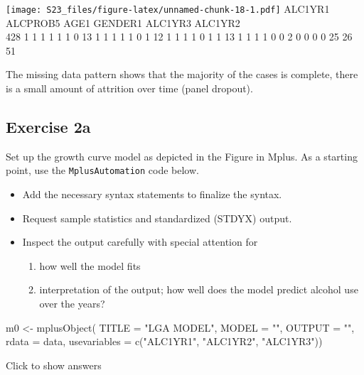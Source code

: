 \documentclass[
]{book}
\newenvironment{Shaded}{\begin{snugshade}}{\end{snugshade}}
\newcommand{\AttributeTok}[1]{\textcolor[rgb]{0.77,0.63,0.00}{#1}}
\newcommand{\FunctionTok}[1]{\textcolor[rgb]{0.00,0.00,0.00}{#1}}
\newcommand{\NormalTok}[1]{#1}
\newcommand{\OtherTok}[1]{\textcolor[rgb]{0.56,0.35,0.01}{#1}}
\newcommand{\StringTok}[1]{\textcolor[rgb]{0.31,0.60,0.02}{#1}}
\providecommand{\tightlist}{%
  \setlength{\itemsep}{0pt}\setlength{\parskip}{0pt}}
\begin{document}
\texttt{[image: S23\_files/figure-latex/unnamed-chunk-18-1.pdf]} ALC1YR1 ALCPROB5 AGE1 GENDER1 ALC1YR3 ALC1YR2\\
428 1 1 1 1 1 1 0
13 1 1 1 1 1 0 1
12 1 1 1 1 0 1 1
13 1 1 1 1 0 0 2
0 0 0 0 25 26 51

The missing data pattern shows that the majority of the cases is complete, there is a small amount of attrition over time (panel dropout).

\hypertarget{exercise-2a}{%
\subsection{Exercise 2a}\label{exercise-2a}}

Set up the growth curve model as depicted in the Figure in Mplus.
As a starting point, use the \texttt{MplusAutomation} code below.

\begin{itemize}
\tightlist
\item
  Add the necessary syntax statements to finalize the syntax.
\item
  Request sample statistics and standardized (STDYX) output.
\item
  Inspect the output carefully with special attention for

  \begin{enumerate}
  \def\labelenumi{\arabic{enumi}.}
  \tightlist
  \item
    how well the model fits
  \item
    interpretation of the output; how well does the model predict alcohol use over the
    years?
  \end{enumerate}
\end{itemize}

\begin{Shaded}
\begin{Highlighting}[]
\NormalTok{m0 }\OtherTok{\textless{}{-}} \FunctionTok{mplusObject}\NormalTok{(}
  \AttributeTok{TITLE =} \StringTok{"LGA MODEL"}\NormalTok{,}
  \AttributeTok{MODEL =} \StringTok{""}\NormalTok{,}
  \AttributeTok{OUTPUT =} \StringTok{""}\NormalTok{,}
  \AttributeTok{rdata =}\NormalTok{ data,}
  \AttributeTok{usevariables =} \FunctionTok{c}\NormalTok{(}\StringTok{"ALC1YR1"}\NormalTok{, }\StringTok{"ALC1YR2"}\NormalTok{, }\StringTok{"ALC1YR3"}\NormalTok{))}
\end{Highlighting}
\end{Shaded}

Click to show answers
\end{document}
